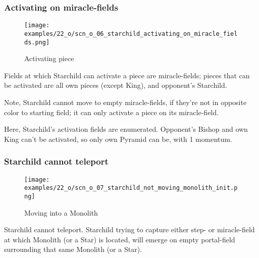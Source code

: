 \subsubsection*{Activating on miracle-fields}
\label{sec:One/Starchild/Movement/Activating on miracle-fields}

\noindent
\begin{wrapfigure}[8]{l}{0.4\textwidth}
\centering
\texttt{[image: examples/22\_o/scn\_o\_06\_starchild\_activating\_on\_miracle\_fields.png]}
\caption{Activating piece}
\label{fig:scn_o_06_starchild_activating_on_miracle_fields}
\end{wrapfigure}
Fields at which Starchild can activate a piece are miracle-fields; pieces that
can be activated are all own pieces (except King), and opponent's Starchild.

Note, Starchild cannot move to empty miracle-fields, if they're not in opposite
color to starting field; it can only activate a piece on its miracle-field.

Here, Starchild's activation fields are enumerated. Opponent's Bishop and own King
can't be activated, so only own Pyramid can be, with 1 momentum.

\clearpage %

\subsubsection*{Starchild cannot teleport}
\label{sec:One/Starchild/Movement/Starchild cannot teleport}

\noindent
\begin{wrapfigure}[6]{l}{0.4\textwidth}
\centering
\texttt{[image: examples/22\_o/scn\_o\_07\_starchild\_not\_moving\_monolith\_init.png]}
\caption{Moving into a Monolith}
\label{fig:scn_o_07_starchild_not_moving_monolith_init}
\end{wrapfigure}
Starchild cannot teleport. Starchild trying to capture either step- or miracle-field
at which Monolith (or a Star) is located, will emerge on empty portal-field
surrounding that same Monolith (or a Star).

